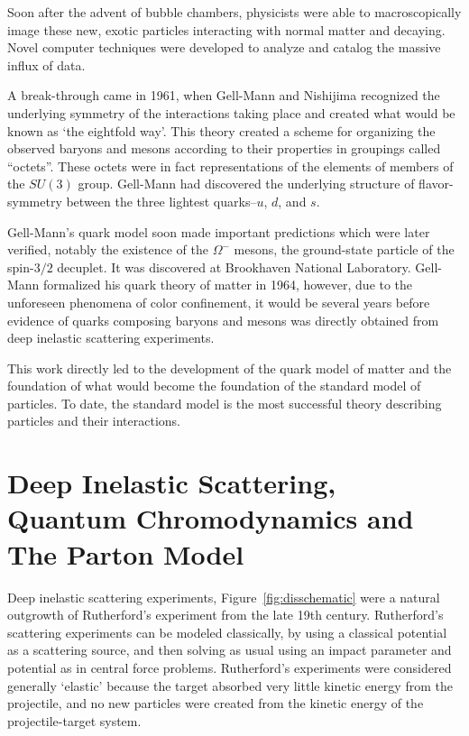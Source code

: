 Soon after the advent of bubble chambers, physicists were able to
macroscopically image these new, exotic particles interacting with normal matter
and decaying. Novel computer techniques were developed to analyze and catalog
the massive influx of data.

A break-through came in 1961, when Gell-Mann and Nishijima recognized the
underlying symmetry of the interactions taking place and created what would be
known as `the eightfold way'. This theory created a scheme for organizing the
observed baryons and mesons according to their properties in groupings called
``octets''. These octets were in fact representations of the elements of members
of the $SU(3)$ group. Gell-Mann had discovered the underlying structure of
flavor-symmetry between the three lightest quarks--$u$, $d$, and $s$. 

Gell-Mann's quark model soon made important predictions which were later
verified, notably the existence of the $\Omega^{-}$ mesons, the ground-state
particle of the spin-$3/2$ decuplet. It was discovered at Brookhaven National
Laboratory. Gell-Mann formalized his quark theory of matter in 1964, however,
due to the unforeseen phenomena of color confinement, it would be several years
before evidence of quarks composing baryons and mesons was directly obtained
from deep inelastic scattering experiments.

This work directly led to the development of the quark model of matter and the
foundation of what would become the foundation of the standard model of
particles. To date, the standard model is the most successful theory describing
particles and their interactions.


\clearpage
\section{Deep Inelastic Scattering, Quantum Chromodynamics and The Parton Model}

Deep inelastic scattering experiments, Figure~\ref{fig:disschematic} were a
natural outgrowth of Rutherford's experiment from the late 19th century.
Rutherford's scattering experiments can be modeled classically, by using a
classical potential as a scattering source, and then solving as usual using an
impact parameter and potential as in central force problems.  Rutherford's
experiments were considered generally `elastic' because the target absorbed very
little kinetic energy from the projectile, and no new particles were created
from the kinetic energy of the projectile-target system.

